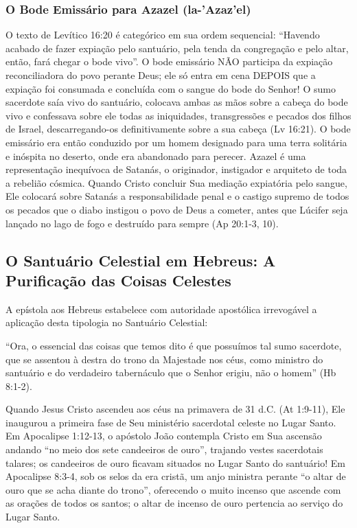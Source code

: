 \subsubsection*{O Bode Emissário para Azazel (la-'Azaz'el)}
O texto de Levítico 16:20 é categórico em sua ordem sequencial: ``Havendo acabado de fazer expiação pelo santuário, pela tenda da congregação e pelo altar, então, fará chegar o bode vivo''. O bode emissário NÃO participa da expiação reconciliadora do povo perante Deus; ele só entra em cena DEPOIS que a expiação foi consumada e concluída com o sangue do bode do Senhor! O sumo sacerdote saía vivo do santuário, colocava ambas as mãos sobre a cabeça do bode vivo e confessava sobre ele todas as iniquidades, transgressões e pecados dos filhos de Israel, descarregando-os definitivamente sobre a sua cabeça (Lv 16:21). O bode emissário era então conduzido por um homem designado para uma terra solitária e inóspita no deserto, onde era abandonado para perecer. Azazel é uma representação inequívoca de Satanás, o originador, instigador e arquiteto de toda a rebelião cósmica. Quando Cristo concluir Sua mediação expiatória pelo sangue, Ele colocará sobre Satanás a responsabilidade penal e o castigo supremo de todos os pecados que o diabo instigou o povo de Deus a cometer, antes que Lúcifer seja lançado no lago de fogo e destruído para sempre (Ap 20:1-3, 10).



\subsection{O Santuário Celestial em Hebreus: A Purificação das Coisas Celestes}


A epístola aos Hebreus estabelece com autoridade apostólica irrevogável a aplicação desta tipologia no Santuário Celestial:

``Ora, o essencial das coisas que temos dito é que possuímos tal sumo sacerdote, que se assentou à destra do trono da Majestade nos céus, como ministro do santuário e do verdadeiro tabernáculo que o Senhor erigiu, não o homem'' (Hb 8:1-2).

Quando Jesus Cristo ascendeu aos céus na primavera de 31 d.C. (At 1:9-11), Ele inaugurou a primeira fase de Seu ministério sacerdotal celeste no Lugar Santo. Em Apocalipse 1:12-13, o apóstolo João contempla Cristo em Sua ascensão andando ``no meio dos sete candeeiros de ouro'', trajando vestes sacerdotais talares; os candeeiros de ouro ficavam situados no Lugar Santo do santuário! Em Apocalipse 8:3-4, sob os selos da era cristã, um anjo ministra perante ``o altar de ouro que se acha diante do trono'', oferecendo o muito incenso que ascende com as orações de todos os santos; o altar de incenso de ouro pertencia ao serviço do Lugar Santo.

